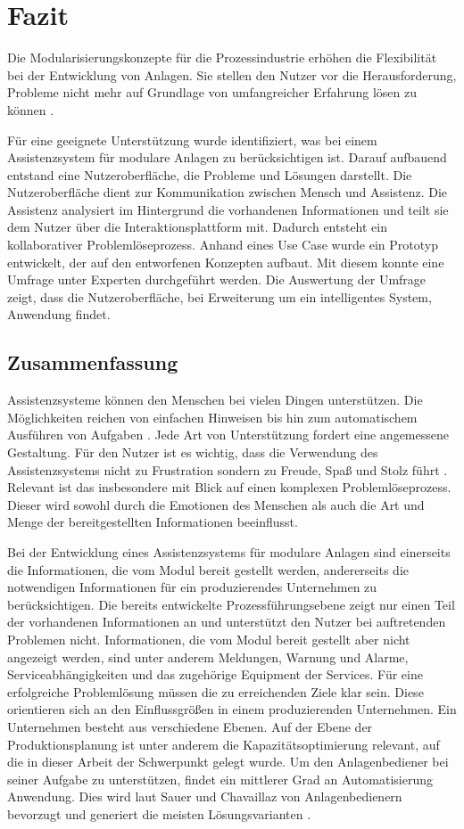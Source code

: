 \chapter{Fazit}
\label{Zusammenfassung}
Die Modularisierungskonzepte für die Prozessindustrie erhöhen die Flexibilität bei der Entwicklung von Anlagen. Sie stellen den Nutzer vor die Herausforderung, Probleme nicht mehr auf Grundlage von umfangreicher Erfahrung lösen zu können \cite{Muller2018}.

Für eine geeignete Unterstützung wurde identifiziert, was bei einem Assistenzsystem für modulare Anlagen zu berücksichtigen ist. Darauf aufbauend entstand eine Nutzeroberfläche, die Probleme und Lösungen darstellt. Die Nutzeroberfläche dient zur Kommunikation zwischen Mensch und Assistenz. Die Assistenz analysiert im Hintergrund die vorhandenen Informationen und teilt sie dem Nutzer über die Interaktionsplattform mit. Dadurch entsteht ein kollaborativer Problemlöseprozess. Anhand eines Use Case wurde ein Prototyp entwickelt, der auf den entworfenen Konzepten aufbaut. Mit diesem konnte eine Umfrage unter Experten durchgeführt werden. Die Auswertung der Umfrage zeigt, dass die Nutzeroberfläche, bei Erweiterung um ein intelligentes System, Anwendung findet.

\section{Zusammenfassung}
Assistenzsysteme können den Menschen bei vielen Dingen unterstützen. Die Möglichkeiten reichen von einfachen Hinweisen bis hin zum automatischem Ausführen von Aufgaben \cite{Wandke2005}. Jede Art von Unterstützung fordert eine angemessene Gestaltung. Für den Nutzer ist es wichtig, dass die Verwendung des Assistenzsystems nicht zu Frustration sondern zu Freude, Spaß und Stolz führt \cite{Hassenzahl2008}. Relevant ist das insbesondere mit Blick auf einen komplexen Problemlöseprozess. Dieser wird sowohl durch die Emotionen des Menschen als auch die Art und Menge der bereitgestellten Informationen beeinflusst. 

Bei der Entwicklung eines Assistenzsystems für modulare Anlagen sind einerseits die Informationen, die vom Modul bereit gestellt werden, andererseits die notwendigen Informationen für ein produzierendes Unternehmen zu berücksichtigen. Die bereits entwickelte Prozessführungsebene zeigt nur einen Teil der vorhandenen Informationen an und unterstützt den Nutzer bei auftretenden Problemen nicht. Informationen, die vom Modul bereit gestellt aber nicht angezeigt werden, sind unter anderem Meldungen, Warnung und Alarme, Serviceabhängigkeiten und das zugehörige Equipment der Services. Für eine erfolgreiche Problemlösung müssen die zu erreichenden Ziele klar sein. Diese orientieren sich an den Einflussgrößen in einem produzierenden Unternehmen. Ein Unternehmen besteht aus verschiedene Ebenen. Auf der Ebene der Produktionsplanung ist unter anderem die Kapazitätsoptimierung relevant, auf die in dieser Arbeit der Schwerpunkt gelegt wurde. Um den Anlagenbediener bei seiner Aufgabe zu unterstützen, findet ein mittlerer Grad an Automatisierung Anwendung. Dies wird laut Sauer und Chavaillaz \cite{Sauer2018} von Anlagenbedienern bevorzugt und generiert die meisten Lösungsvarianten \cite{Miller2005}.

